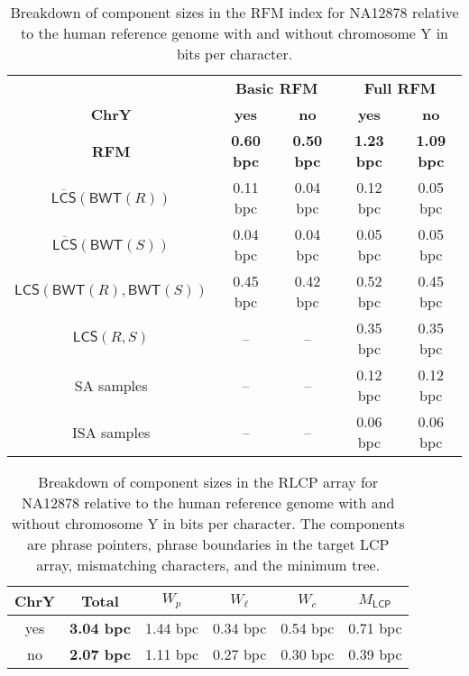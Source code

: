 \documentclass[a4paper,11pt]{llncs}
\renewcommand{\complement}[1]{\ensuremath{\overline{ #1 }}}
\newcommand{\SA}{\textsf{SA}}
\newcommand{\ISA}{\textsf{ISA}}
\newcommand{\RFM}{\textsf{RFM}}
\newcommand{\mBWT}{\ensuremath{\mathsf{BWT}}}
\newcommand{\LCP}{\textsf{LCP}}
\newcommand{\RLCP}{\textsf{RLCP}}
\newcommand{\mLCP}{\ensuremath{\mathsf{LCP}}}
\newcommand{\mLCS}{\ensuremath{\mathsf{LCS}}}
\newcommand{\mCS}{\ensuremath{\complement{\mathsf{LCS}}}}
\begin{document}
\begin{table}
\caption{Breakdown of component sizes in the \RFM{} index for NA12878 relative to the human reference genome with and without chromosome Y in bits per character.}\label{table:rfm components}
\setlength{\extrarowheight}{2pt}
\setlength{\tabcolsep}{3pt}
\begin{center}
\begin{tabular}{c|cc|cc}
\hline
 & \multicolumn{2}{c|}{\textbf{Basic \RFM}} & \multicolumn{2}{c}{\textbf{Full \RFM}} \\
\textbf{ChrY} & \textbf{yes} & \textbf{no} & \textbf{yes} & \textbf{no} \\
\hline
\textbf{\RFM}              & \textbf{0.60 bpc} & \textbf{0.50 bpc} & \textbf{1.23 bpc} & \textbf{1.09 bpc} \\
$\mCS(\mBWT(R))$           &          0.11 bpc &          0.04 bpc &          0.12 bpc &          0.05 bpc \\
$\mCS(\mBWT(S))$           &          0.04 bpc &          0.04 bpc &          0.05 bpc &          0.05 bpc \\
$\mLCS(\mBWT(R),\mBWT(S))$ &          0.45 bpc &          0.42 bpc &          0.52 bpc &          0.45 bpc \\
$\mLCS(R,S)$               &                -- &                -- &          0.35 bpc &          0.35 bpc \\
\SA{} samples              &                -- &                -- &          0.12 bpc &          0.12 bpc \\
\ISA{} samples             &                -- &                -- &          0.06 bpc &          0.06 bpc \\
\hline
\end{tabular}
\end{center}
\end{table}

\begin{table}
\caption{Breakdown of component sizes in the \RLCP{} array for NA12878 relative to the human reference genome with and without chromosome Y in bits per character. The components are phrase pointers, phrase boundaries in the target \LCP{} array, mismatching characters, and the minimum tree.}\label{table:rlcp components}
\setlength{\extrarowheight}{2pt}
\setlength{\tabcolsep}{3pt}
\begin{center}
\begin{tabular}{c|ccccc}
\hline
\textbf{ChrY} & \textbf{Total}    & $W_{p}$  & $W_{\ell}$ & $W_{c}$  & $M_{\mLCP}$ \\
\hline
yes           & \textbf{3.04 bpc} & 1.44 bpc &   0.34 bpc & 0.54 bpc &    0.71 bpc \\
no            & \textbf{2.07 bpc} & 1.11 bpc &   0.27 bpc & 0.30 bpc &    0.39 bpc \\
\hline
\end{tabular}
\end{center}
\end{table}
\end{document}
